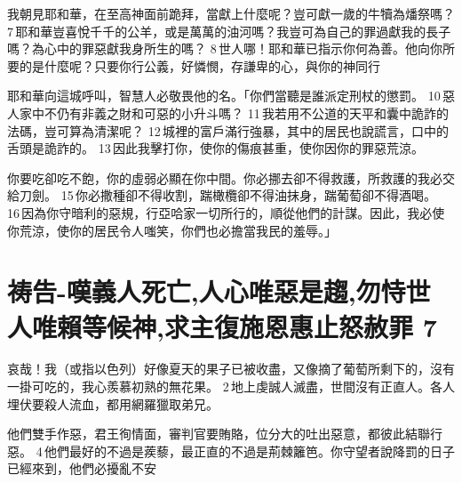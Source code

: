 我朝見耶和華，在至高神面前跪拜，當獻上什麼呢？豈可獻一歲的牛犢為燔祭嗎？ 7 耶和華豈喜悅千千的公羊，或是萬萬的油河嗎？我豈可為自己的罪過獻我的長子嗎？為心中的罪惡獻我身所生的嗎？ 8 世人哪！耶和華已指示你何為善。他向你所要的是什麼呢？只要你行公義，好憐憫，存謙卑的心，與你的神同行

耶和華向這城呼叫，智慧人必敬畏他的名。「你們當聽是誰派定刑杖的懲罰。 10 惡人家中不仍有非義之財和可惡的小升斗嗎？ 11 我若用不公道的天平和囊中詭詐的法碼，豈可算為清潔呢？ 12 城裡的富戶滿行強暴，其中的居民也說謊言，口中的舌頭是詭詐的。 13 因此我擊打你，使你的傷痕甚重，使你因你的罪惡荒涼。



你要吃卻吃不飽，你的虛弱必顯在你中間。你必挪去卻不得救護，所救護的我必交給刀劍。 15 你必撒種卻不得收割，踹橄欖卻不得油抹身，踹葡萄卻不得酒喝。 16 因為你守暗利的惡規，行亞哈家一切所行的，順從他們的計謀。因此，我必使你荒涼，使你的居民令人嗤笑，你們也必擔當我民的羞辱。」

\section{祷告-嘆義人死亡,人心唯惡是趨,勿恃世人唯賴等候神,求主復施恩惠止怒赦罪 7}

哀哉！我（或指以色列）好像夏天的果子已被收盡，又像摘了葡萄所剩下的，沒有一掛可吃的，我心羨慕初熟的無花果。 2 地上虔誠人滅盡，世間沒有正直人。各人埋伏要殺人流血，都用網羅獵取弟兄。

他們雙手作惡，君王徇情面，審判官要賄賂，位分大的吐出惡意，都彼此結聯行惡。 4 他們最好的不過是蒺藜，最正直的不過是荊棘籬笆。你守望者說降罰的日子已經來到，他們必擾亂不安

